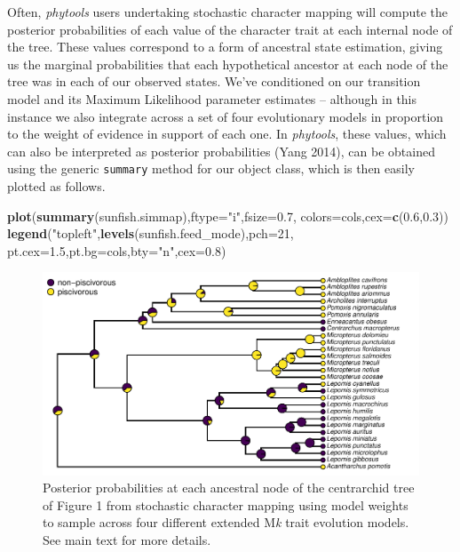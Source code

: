 \documentclass[fleqn,10pt,lineno]{wlpeerj} %
\newenvironment{Shaded}{\begin{snugshade}}{\end{snugshade}}
\newcommand{\AttributeTok}[1]{\textcolor[rgb]{0.13,0.29,0.53}{#1}}
\newcommand{\DecValTok}[1]{\textcolor[rgb]{0.00,0.00,0.81}{#1}}
\newcommand{\FloatTok}[1]{\textcolor[rgb]{0.00,0.00,0.81}{#1}}
\newcommand{\FunctionTok}[1]{\textcolor[rgb]{0.13,0.29,0.53}{\textbf{#1}}}
\newcommand{\NormalTok}[1]{#1}
\newcommand{\StringTok}[1]{\textcolor[rgb]{0.31,0.60,0.02}{#1}}
\begin{document}
Often, \emph{phytools} users undertaking stochastic character mapping will compute the posterior probabilities of each value of the character trait at each internal node of the tree. These values correspond to a form of ancestral state estimation, giving us the marginal probabilities that each hypothetical ancestor at each node of the tree was in each of our observed states. We've conditioned on our transition model and its Maximum Likelihood parameter estimates -- although in this instance we also integrate across a set of four evolutionary models in proportion to the weight of evidence in support of each one. In \emph{phytools}, these values, which can also be interpreted as posterior probabilities (Yang 2014), can be obtained using the generic \texttt{summary} method for our object class, which is then easily plotted as follows.

\begin{Shaded}
\begin{Highlighting}[]
\FunctionTok{plot}\NormalTok{(}\FunctionTok{summary}\NormalTok{(sunfish.simmap),}\AttributeTok{ftype=}\StringTok{"i"}\NormalTok{,}\AttributeTok{fsize=}\FloatTok{0.7}\NormalTok{,}
  \AttributeTok{colors=}\NormalTok{cols,}\AttributeTok{cex=}\FunctionTok{c}\NormalTok{(}\FloatTok{0.6}\NormalTok{,}\FloatTok{0.3}\NormalTok{))}
\FunctionTok{legend}\NormalTok{(}\StringTok{"topleft"}\NormalTok{,}\FunctionTok{levels}\NormalTok{(sunfish.feed\_mode),}\AttributeTok{pch=}\DecValTok{21}\NormalTok{,}
  \AttributeTok{pt.cex=}\FloatTok{1.5}\NormalTok{,}\AttributeTok{pt.bg=}\NormalTok{cols,}\AttributeTok{bty=}\StringTok{"n"}\NormalTok{,}\AttributeTok{cex=}\FloatTok{0.8}\NormalTok{)}
\end{Highlighting}
\end{Shaded}

\begin{figure}
\includegraphics[width=1\linewidth]{Revell.phytools-v2_peerj_files/figure-latex/posterior-probs-1} \caption{Posterior probabilities at each ancestral node of the centrarchid tree of Figure 1 from stochastic character mapping using model weights to sample across four different extended M\textit{k} trait evolution models. See main text for more details.}\label{fig:posterior-probs}
\end{figure}
\end{document}

